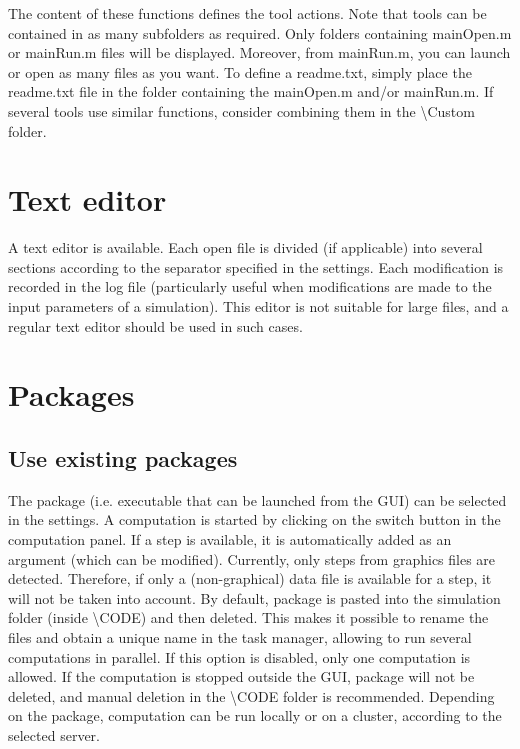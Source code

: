 \documentclass{article}
\begin{document}
The content of these functions defines the tool actions. Note that tools can be contained in as many subfolders as required. Only folders containing mainOpen.m or mainRun.m files will be displayed. Moreover, from mainRun.m, you can launch or open as many files as you want. To define a readme.txt, simply place the readme.txt file in the folder containing the mainOpen.m and/or mainRun.m. If several tools use similar functions, consider combining them in the \textbackslash Custom folder.

\section{Text editor}

A text editor is available. Each open file is divided (if applicable) into several sections according to the separator specified in the settings. Each modification is recorded in the log file (particularly useful when modifications are made to the input parameters of a simulation). This editor is not suitable for large files, and a regular text editor should be used in such cases.

\section{Packages}

\subsection{Use existing packages}

The package (i.e. executable that can be launched from the GUI) can be selected in the settings. A computation is started by clicking on the switch button in the computation panel. If a step is available, it is automatically added as an argument (which can be modified). Currently, only steps from graphics files are detected. Therefore, if only a (non-graphical) data file is available for a step, it will not be taken into account. By default, package is pasted into the simulation folder (inside \textbackslash CODE) and then deleted. This makes it possible to rename the files and obtain a unique name in the task manager, allowing to run several computations in parallel. If this option is disabled, only one computation is allowed. If the computation is stopped outside the GUI, package will not be deleted, and manual deletion in the \textbackslash CODE folder is recommended. Depending on the package, computation can be run locally or on a cluster, according to the selected server.
\end{document}
